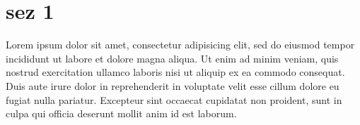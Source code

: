 \documentclass[a4paper,10pt]{report} %
\begin{document}
    \section{sez 1}
      Lorem ipsum dolor sit amet, consectetur adipisicing elit, sed do eiusmod tempor incididunt ut labore et dolore magna aliqua. Ut enim ad minim veniam, quis nostrud exercitation ullamco laboris nisi ut aliquip ex ea commodo consequat. Duis aute irure dolor in reprehenderit in voluptate velit esse cillum dolore eu fugiat nulla pariatur. Excepteur sint occaecat cupidatat non proident, sunt in culpa qui officia deserunt mollit anim id est laborum.
\end{document}
